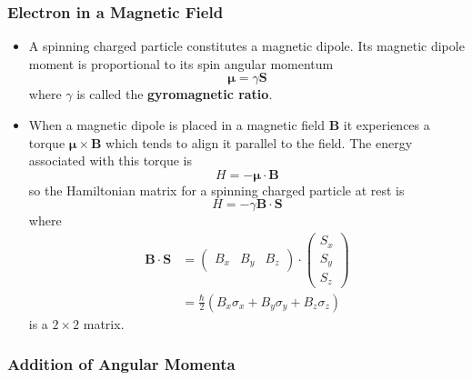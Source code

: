 \documentclass{article}
\renewcommand{\vec}[1]{\boldsymbol{\mathbf{#1}}}
\begin{document}
\subsubsection{Electron in a Magnetic Field}

\begin{itemize}
  \item A spinning charged particle constitutes a magnetic dipole. Its magnetic dipole moment is proportional to its spin angular momentum \[\vec{\mu} = \gamma \vec{S}\] where $\gamma$ is called the \textbf{gyromagnetic ratio}.

  \item When a magnetic dipole is placed in a magnetic field $\vec{B}$ it experiences a torque $\vec{\mu} \times \vec{B}$ which tends to align it parallel to the field. The energy associated with this torque is \[H = -\vec{\mu} \cdot \vec{B}\] so the Hamiltonian matrix for a spinning charged particle at rest is \[H = -\gamma \vec{B} \cdot \vec{S}\] where \begin{align*}
          \vec{B} \cdot \vec{S} & = \begin{pmatrix}
                                      B_x & B_y & B_z
                                    \end{pmatrix} \cdot \begin{pmatrix}
                                                          S_x \\
                                                          S_y \\
                                                          S_z
                                                        \end{pmatrix}                           \\
                                & = \frac{\hbar}{2} (B_x \sigma_x + B_y \sigma_y + B_z \sigma_z)
        \end{align*} is a $2 \times 2$ matrix.
\end{itemize}

\subsubsection{Addition of Angular Momenta}
\end{document}

